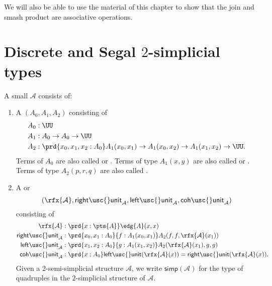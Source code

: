 We will also be able to use the material of this chapter to show that the join and smash product are associative operations. 

\section{Discrete and Segal \texorpdfstring{$2$}{2}-simplicial types}

\begin{defn}
A small  $\mathcal{A}$ consists of:
\begin{enumerate}
\item A  $(A_0,A_1,A_2)$ consisting of
\begin{align*}
A_0 & : \UU \\
A_1 & : A_0 \to A_0 \to \UU \\
A_2 & : \prd{x_0,x_1,x_2:A_0} A_1(x_0,x_1)\to A_1(x_0,x_2)\to A_1(x_1,x_2)\to\UU.
\end{align*}
Terms of $A_0$ are also called  or . Terms of type $A_1(x,y)$ are also called  or . Terms of type $A_2(p,r,q)$ are also called .
\item A  or 
\begin{equation*}
(\rfx{\mathcal{A}},\mathsf{right\usc{}unit}_{\mathcal{A}},\mathsf{left\usc{}unit}_{\mathcal{A}},\mathsf{coh\usc{}unit}_{\mathcal{A}})
\end{equation*}
consisting of
\begin{align*}
\rfx{\mathcal{A}} & : \prd{x:\pts{A}} \edg{A}(x,x) \\
\mathsf{right\usc{}unit}_{\mathcal{A}} & : \prd{x_0,x_1:A_0}{f:A_1(x_0,x_1)} A_2(f,f,\rfx{\mathcal{A}}(x_1)) \\
\mathsf{left\usc{}unit}_{\mathcal{A}} & : \prd{x_1,x_2:A_0}{g:A_1(x_1,x_2)} A_2(\rfx{\mathcal{A}}(x_1),g,g) \\
\mathsf{coh\usc{}unit}_{\mathcal{A}} & : \prd{x:A_0} \mathsf{left\usc{}unit}(\rfx{\mathcal{A}}(x))=\mathsf{right\usc{}unit}(\rfx{\mathcal{A}}(x)).
\end{align*}
Given a 2-semi-simplicial structure $\mathcal{A}$, we write $\mathsf{simp}(\mathcal{A})$ for the type of quadruples in the $2$-simplicial structure of $\mathcal{A}$.
\end{enumerate}
\end{defn}

